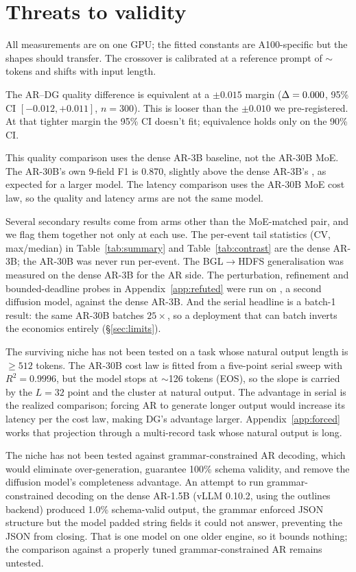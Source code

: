 \section{Threats to validity}
\label{sec:threats}

All measurements are on one GPU; the fitted constants are A100-specific
but the shapes should transfer. The crossover is calibrated at a
reference prompt of $\sim$\,tokens and shifts with input
length.

The AR--DG quality difference is equivalent at a $\pm 0.015$ margin
($\Delta = 0.000$, 95\% CI $[-0.012, +0.011]$, $n = 300$).
This is looser than the $\pm 0.010$ we pre-registered. At that
tighter margin the 95\% CI doesn't fit; equivalence holds only on
the 90\% CI.

This quality comparison uses the dense AR-3B baseline, not the AR-30B
MoE. The AR-30B's own 9-field F1 is 0.870, slightly above the dense
AR-3B's \arThreeBFnine, as expected for a larger model. The latency
comparison uses the AR-30B MoE cost law, so the quality and latency
arms are not the same model.

Several secondary results come from arms other than the MoE-matched
pair, and we flag them together not only at each use. The
per-event tail statistics (CV, max/median) in Table~\ref{tab:summary}
and Table~\ref{tab:contrast} are the dense AR-3B; the AR-30B was never
run per-event. The BGL$\to$HDFS generalisation was measured on the
dense AR-3B for the AR side. The perturbation, refinement and
bounded-deadline probes in Appendix~\ref{app:refuted} were run on
\LLaDA, a second diffusion model, against the dense AR-3B. And the
serial headline is a batch-1 result: the same AR-30B batches
$25\times$, so a deployment that can batch inverts the economics
entirely (\S\ref{sec:limits}).

The surviving niche has not been tested on a task whose natural output
length is $\geq 512$ tokens. The AR-30B cost law is fitted from a
five-point serial sweep with $R^2 = 0.9996$, but the model stops at
$\sim$126 tokens (EOS), so the slope is carried by the $L{=}32$ point
and the cluster at natural output. The advantage in serial is the
realized comparison; forcing AR to generate longer output would
increase its latency per the cost law, making DG's advantage larger.
Appendix~\ref{app:forced} works that projection through a multi-record
task whose natural output is long.

The niche has not been tested against grammar-constrained AR decoding,
which would eliminate over-generation, guarantee 100\% schema
validity, and remove the diffusion model's completeness advantage. An
attempt to run grammar-constrained decoding on the dense AR-1.5B
(vLLM 0.10.2, using the outlines~\cite{outlines2024} backend) produced
1.0\% schema-valid output, the grammar enforced JSON structure but
the model padded string fields it could not answer, preventing the JSON
from closing. That is one model on one older engine, so it bounds
nothing; the comparison against a properly tuned grammar-constrained
AR remains untested.

